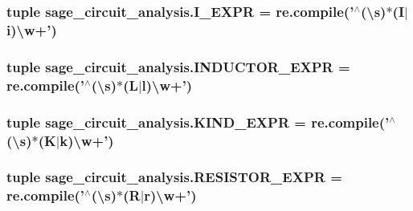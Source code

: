\hypertarget{namespacesage__circuit__analysis_aabc5e7c1a370cb2805023e6eef2ea933}{
\subsubsection[{I\-\_\-\-E\-X\-P\-R}]{\setlength{\rightskip}{0pt plus 5cm}tuple sage\-\_\-circuit\-\_\-analysis.\-I\-\_\-\-E\-X\-P\-R = re.\-compile('$^\wedge$(\textbackslash{}s)$\ast$(I$|$i)\textbackslash{}w+')}}\label{namespacesage__circuit__analysis_aabc5e7c1a370cb2805023e6eef2ea933}
\hypertarget{namespacesage__circuit__analysis_a28ab0d30d46181ac6d7b033ef4cd7b2a}{
\subsubsection[{I\-N\-D\-U\-C\-T\-O\-R\-\_\-\-E\-X\-P\-R}]{\setlength{\rightskip}{0pt plus 5cm}tuple sage\-\_\-circuit\-\_\-analysis.\-I\-N\-D\-U\-C\-T\-O\-R\-\_\-\-E\-X\-P\-R = re.\-compile('$^\wedge$(\textbackslash{}s)$\ast$(L$|$l)\textbackslash{}w+')}}\label{namespacesage__circuit__analysis_a28ab0d30d46181ac6d7b033ef4cd7b2a}
\hypertarget{namespacesage__circuit__analysis_a4d87352a85623b7cc6ab51c2f07165fb}{
\subsubsection[{K\-I\-N\-D\-\_\-\-E\-X\-P\-R}]{\setlength{\rightskip}{0pt plus 5cm}tuple sage\-\_\-circuit\-\_\-analysis.\-K\-I\-N\-D\-\_\-\-E\-X\-P\-R = re.\-compile('$^\wedge$(\textbackslash{}s)$\ast$(K$|$k)\textbackslash{}w+')}}\label{namespacesage__circuit__analysis_a4d87352a85623b7cc6ab51c2f07165fb}
\hypertarget{namespacesage__circuit__analysis_ad653e45f39302e51c2249c43c0a2d095}{
\subsubsection[{R\-E\-S\-I\-S\-T\-O\-R\-\_\-\-E\-X\-P\-R}]{\setlength{\rightskip}{0pt plus 5cm}tuple sage\-\_\-circuit\-\_\-analysis.\-R\-E\-S\-I\-S\-T\-O\-R\-\_\-\-E\-X\-P\-R = re.\-compile('$^\wedge$(\textbackslash{}s)$\ast$(R$|$r)\textbackslash{}w+')}}\label{namespacesage__circuit__analysis_ad653e45f39302e51c2249c43c0a2d095}
